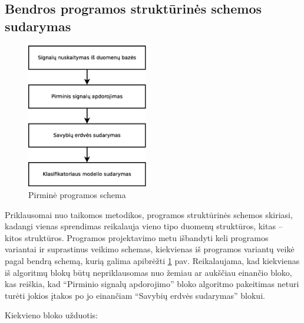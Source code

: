 \documentclass[]{vgtuef}
\begin{document}
\subsection{Bendros programos struktūrinės schemos sudarymas}

\begin{figure}[!b]
  \centering
  \includegraphics[width=200px]{figures/pirmine_schema.eps}
  \caption{Pirminė programos schema}
  \label{fig:pirmine_programos_schema}
\end{figure}

Priklausomai nuo taikomos metodikos, programos struktūrinės schemos skiriasi, kadangi vienas sprendimas reikalauja vieno tipo duomenų struktūros, kitas -- kitos struktūros. Programos projektavimo metu išbandyti keli programos variantai ir suprastinus veikimo schemas, kiekvienas iš programos variantų veikė pagal bendrą schemą, kurią galima apibrėžti \ref{fig:pirmine_programos_schema} pav. Reikalaujama, kad kiekvienas iš algoritmų blokų būtų nepriklausomas nuo žemiau ar aukščiau einančio bloko, kas reiškia, kad ``Pirminio signalų apdorojimo'' bloko algoritmo pakeitimas neturi turėti jokios įtakos po jo einančiam ``Savybių erdvės sudarymas'' blokui. 

Kiekvieno bloko užduotis:
\end{document}
